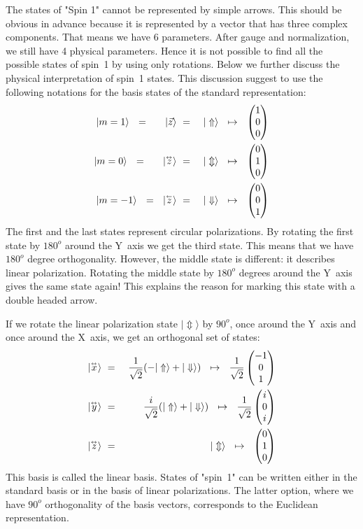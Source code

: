 \documentclass[onecolumn,fleqn, 11pt]{revtex4}
\newcommand{\vecb}[1]{\overset{{}_{\leftarrow}}{#1}}
\newcommand{\vecm}[1]{\overset{{}_{\leftrightarrow}}{#1}}
\newcommand{\amatrix}[1]{\begin{matrix} #1 \end{matrix}}
\newcommand{\beq}{\begin{eqnarray}}
\newcommand{\eeq}{\end{eqnarray}}
\begin{document}
The states of "Spin 1" cannot be represented 
by simple arrows. This should be obvious  
in advance because it is represented by 
a vector that has three complex components. 
That means we have 6 parameters. 
After gauge and normalization, we still have 4 physical parameters.  
Hence it is not possible to find all the possible 
states of spin~1 by using only rotations.
Below we further discuss the physical 
interpretation of spin~1 states. This discussion 
suggest to use the following notations  
for the basis states of the standard representation:   
\beq
|m=1 \rangle 
\ \ = \ \  
\ \ \ | \vec{z} \rangle 
& \ = \ &   | \Uparrow \rangle 
\ \  \mapsto \ \  
\left(\amatrix{1 \cr 0 \cr 0 }\right) 
\\ 
|m=0 \rangle 
\ \ = \ \
\ \ \ | \vecm{z} \rangle 
& \ = \ & | \Updownarrow \rangle 
\ \  \mapsto \ \ 
\left(\amatrix{0 \cr 1 \cr 0 }\right) 
\\ 
|m=-1 \rangle 
\ \ = \ \
|\vecb{z} \rangle 
& \ = \ & | \Downarrow \rangle 
\ \  \mapsto \ \ 
\left(\amatrix{0 \cr 0 \cr 1 }\right) 
\eeq
The first and the last states represent circular polarizations. 
By rotating the first state by ${180^o}$ around the Y~axis 
we get the third state. This means that we have $180^o$ degree 
orthogonality. However, the middle state is different:  
it describes linear polarization. Rotating the middle 
state by $180^o$ degrees around the Y~axis
gives the same state again! This explains the reason 
for marking this state with a double headed arrow.  
  
If we rotate the linear polarization 
state ${|\Updownarrow \rangle}$ by ${90^o}$, 
once around the Y~axis and once around the X~axis,  
we get an orthogonal set of states:
\beq
| \vecm{x} \rangle 
& \ = \ & \frac{1}{\sqrt{2}}(-| \Uparrow \rangle + | \Downarrow \rangle ) 
\ \  \mapsto \ \  
\frac{1}{\sqrt{2}} \left(\amatrix{-1 \cr 0 \cr 1 }\right)
\\ 
| \vecm{y} \rangle 
& \ = \ & \frac{i}{\sqrt{2}}(| \Uparrow \rangle + | \Downarrow \rangle ) 
\ \  \mapsto \ \  
\frac{1}{\sqrt{2}} \left(\amatrix{i \cr 0 \cr i }\right)
\\ 
| \vecm{z} \rangle 
& \ = \ & | \Updownarrow \rangle 
\ \  \mapsto \ \  
\left(\amatrix{0 \cr 1 \cr 0 }\right) 
\eeq
This basis is called the linear basis. States 
of "spin~1" can be written either in the standard basis
or in the basis of linear polarizations. The latter   
option, where we have $90^o$ orthogonality of 
the basis vectors, corresponds to the Euclidean representation. 
 
\end{document}
